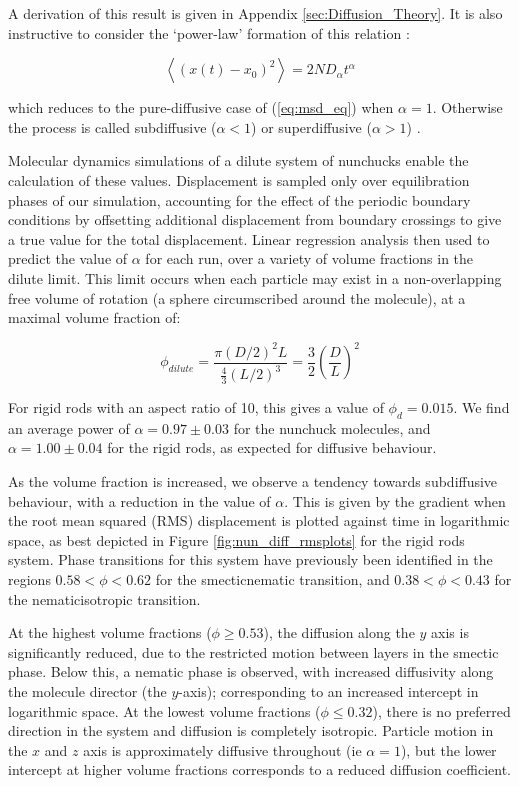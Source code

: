 \documentclass[11pt, a4paper]{article} %
\begin{document}
A derivation of this result is given in Appendix \ref{sec:Diffusion_Theory}. It is also instructive to consider the `power-law' formation of this relation \cite{Ernst2013}: 

\begin{equation}
\left\langle \left(x(t) - x_{0}\right)^{2} \right\rangle = 2ND_{\alpha}t^{\alpha}
\end{equation}

which reduces to the pure-diffusive case of (\ref{eq:msd_eq}) when $\alpha=1$. Otherwise the process is called subdiffusive ($\alpha < 1$) or superdiffusive ($\alpha > 1$) \cite{Metzler2000}. 

Molecular dynamics simulations of a dilute system of nunchucks enable the calculation of these values. Displacement is sampled only over equilibration phases of our simulation, accounting for the effect of the periodic boundary conditions by offsetting additional displacement from boundary crossings to give a true value for the total displacement. Linear regression analysis then used to predict the value of $\alpha$ for each run, over a variety of volume fractions in the dilute limit. This limit occurs when each particle may exist in a non-overlapping free volume of rotation (a sphere circumscribed around the molecule), at a maximal volume fraction of:

\begin{equation}
\phi_{dilute} = \frac{\pi(D/2)^{2}L}{\frac{4}{3}(L/2)^{3}} = \frac{3}{2} \left( \frac{D}{L}\right)^{2} 
\end{equation}

For rigid rods with an aspect ratio of 10, this gives a value of $\phi_{d} = 0.015$. We find an average power of $ \alpha = 0.97 \pm 0.03 $ for the nunchuck molecules, and $ \alpha = 1.00 \pm 0.04 $ for the rigid rods, as expected for diffusive behaviour. 

As the volume fraction is increased, we observe a tendency towards subdiffusive behaviour, with a reduction in the value of $\alpha$. This is given by the gradient when the root mean squared (RMS) displacement is plotted against time in logarithmic space, as best depicted in Figure \ref{fig:nun_diff_rmsplots} for the rigid rods system. Phase transitions for this system have previously been identified in the regions $0.58<\phi<0.62$ for the smectic\textendash nematic transition, and $0.38<\phi<0.43$ for the nematic\textendash isotropic transition.

At the highest volume fractions ($\phi \geq 0.53$), the diffusion along the $y$ axis is significantly reduced, due to the restricted motion between layers in the smectic phase. Below this, a nematic phase is observed, with increased diffusivity along the molecule director (the $y$-axis); corresponding to an increased intercept in logarithmic space. At the lowest volume fractions ($\phi \leq 0.32$), there is no preferred direction in the system and diffusion is completely isotropic. Particle motion in the $x$ and $z$ axis is approximately diffusive throughout (ie $\alpha = 1$), but the lower intercept at higher volume fractions corresponds to a reduced diffusion coefficient. 
\end{document}
